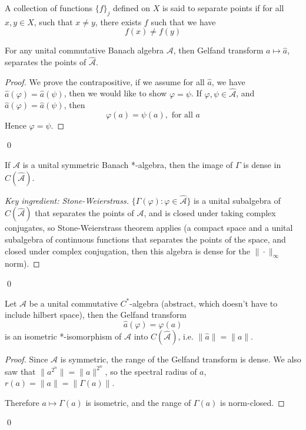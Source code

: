 \begin{definition}
    A collection of functions $\{f\}_j$ defined on $X$ is said to separate points if for all $x,y\in X$, such that $x\neq y$, there exists $f$ such that we have
    \begin{equation*}
        f(x)\neq f(y)
    \end{equation*}
\end{definition}
\begin{proposition}
    For any unital commutative Banach algebra $\mathcal{A}$, then Gelfand transform $a\mapsto\widehat{a}$, separates the points of $\widehat{\mathcal{A}}$.
\end{proposition}
\begin{proof}
    We prove the contrapositive, if we assume for all $\widehat{a}$, we have $\widehat{a}(\varphi)=\widehat{a}(\psi)$, then we would like to show $\varphi=\psi$.
    If $\varphi,\psi\in\widehat{\mathcal{A}}$, and $\widehat{a}(\varphi)=\widehat{a}(\psi)$, then 
    \begin{equation*}
        \varphi(a)=\psi(a), \text{ for all } a
    \end{equation*}
    Hence $\varphi=\psi$.
\end{proof}
\qed

\begin{proposition}
    If $\mathcal{A}$ is a unital symmetric Banach *-algebra, then the image of $\Gamma$ is dense in $C(\widehat{\mathcal{A}})$.
\end{proposition}
\begin{proof}[Key ingredient: Stone-Weierstrass]
    $\{\Gamma(\varphi):\varphi\in\widehat{\mathcal{A}}\}$ is a unital subalgebra of $C(\widehat{\mathcal{A}})$ that separates the points of $\mathcal{A}$, and is closed under taking complex conjugates, so Stone-Weierstrass theorem applies (a compact space and a unital subalgebra of continuous functions that separates the points of the space, and closed under complex conjugation, then this algebra is dense for the $\|\cdot\|_\infty$ norm).
\end{proof}
\qed

\begin{theorem}
    Let $\mathcal{A}$ be a unital commutative $C^*$-algebra (abstract, which doesn't have to include hilbert space), then the Gelfand transform
    \begin{equation*}
        \widehat{a}(\varphi)=\varphi(a)
    \end{equation*}
    is an isometric *-isomorphism of $\mathcal{A}$ into $C(\widehat{\mathcal{A}})$, i.e. $\|\widehat{a}\|=\|a\|$.   
\end{theorem}
\begin{proof}
    Since $\mathcal{A}$ is symmetric, the range of the Gelfand transform is dense. We also saw that $\|a^{2^n}\|=\|a\|^{2^n}$, so the spectral radius of $a$, $r(a)=\|a\|=\|\Gamma(a)\|$. 

    Therefore $a\mapsto\Gamma(a)$ is isometric, and the range of $\Gamma(a)$ is norm-closed.
\end{proof}
\qed

